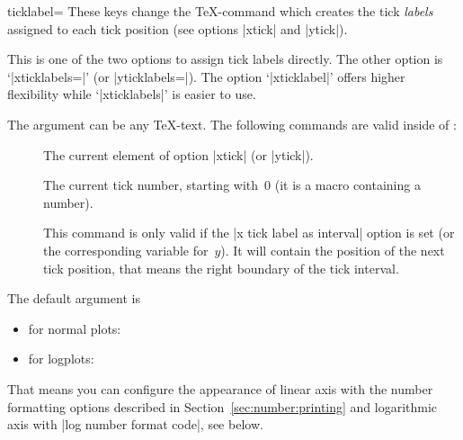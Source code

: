 \begin{pgfplotsxykey}{\x ticklabel=}
These keys change the \TeX-command which creates the tick \emph{labels} assigned to each tick position (see options |xtick| and |ytick|). 

This is one of the two options to assign tick labels directly. The other option is `|xticklabels=|' (or |yticklabels=|). The option `|xticklabel|' offers higher flexibility while `|xticklabels|' is easier to use.

The argument  can be any \TeX-text. The following commands are valid inside of :
\begin{description}
	\item[] \declareandlabel{\tick} The current element of option |xtick| (or |ytick|).
	\item[] \declareandlabel{\ticknum} The current tick number, starting with~0 (it is a macro containing a number).
	\item[] \declareandlabel{\nexttick} This command is only valid if the |x tick label as interval| option is set (or the corresponding variable for~$y$). It will contain the position of the next tick position, that means the right boundary of the tick interval.
\end{description}
The default argument is 
\begin{itemize}
	\item \declareandlabel{\axisdefaultticklabel} for normal plots:
\begin{codeexample}
\def\axisdefaultticklabel{$\pgfmathprintnumber{\tick}$}
\end{codeexample}

	\item \declareandlabel{\axisdefaultticklabellog} for logplots:
\begin{codeexample}
\def\axisdefaultticklabellog{%
	\pgfkeysgetvalue{/pgfplots/log number format code/.@cmd}\pgfplots@log@label@style
	\expandafter\pgfplots@log@label@style\tick\pgfeov
}
\end{codeexample}
\end{itemize}
That means you can configure the appearance of linear axis with the number formatting options described in Section~\ref{sec:number:printing} and logarithmic axis with |log number format code|, see below.

\begin{codeexample}[]
\end{codeexample}


\end{pgfplotsxykey}
